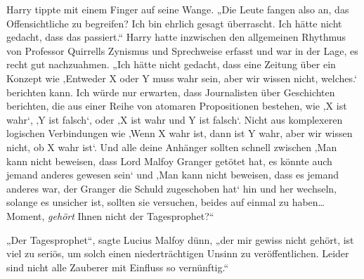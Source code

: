 Harry tippte mit einem Finger auf seine Wange. „Die Leute fangen also an, das Offensichtliche zu begreifen? Ich bin ehrlich gesagt überrascht. Ich hätte nicht gedacht, dass das passiert.“
Harry hatte inzwischen den allgemeinen Rhythmus von Professor Quirrells Zynismus und Sprechweise erfasst und war in der Lage, es recht gut nachzuahmen.
„Ich hätte nicht gedacht, dass eine Zeitung über ein Konzept wie ‚Entweder X oder Y muss wahr sein, aber wir wissen nicht, welches.‘ berichten kann. Ich würde nur erwarten, dass Journalisten über Geschichten berichten, die aus einer Reihe von atomaren Propositionen bestehen, wie ‚X ist wahr‘, ‚Y ist falsch‘, oder ‚X ist wahr und Y ist falsch‘. Nicht aus komplexeren logischen Verbindungen wie ‚Wenn X wahr ist, dann ist Y wahr, aber wir wissen nicht, ob X wahr ist‘. Und alle deine Anhänger sollten schnell zwischen ‚Man kann nicht beweisen, dass Lord Malfoy Granger getötet hat, es könnte auch jemand anderes gewesen sein‘ und ‚Man kann nicht beweisen, dass es jemand anderes war, der Granger die Schuld zugeschoben hat‘ hin und her wechseln, solange es unsicher ist, sollten sie versuchen, beides auf einmal zu haben…
Moment, \emph{gehört} Ihnen nicht der Tagesprophet?“

„Der Tagesprophet“, sagte Lucius Malfoy dünn, „der mir gewiss nicht gehört, ist viel zu seriös, um solch einen niederträchtigen Unsinn zu veröffentlichen. Leider sind nicht alle Zauberer mit Einfluss so vernünftig.“

